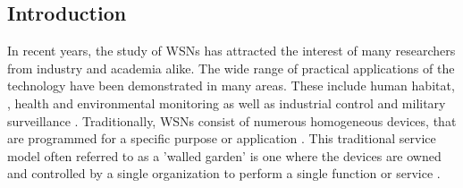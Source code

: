 \subsection{Introduction}

\begin{comment}
The study of Wireless Sensor Networks (WSNs) has increasingly attracted the interest of many researchers in recent years. Their wide range of possible applications have been demonstrated in many areas. These include human habitat, \cite{mainwaring2002wireless}, health \cite{virone2006advanced} and environmental monitoring \cite{4379685,cardell2004field} as well as industry control \cite{1631480} and military surveillance \cite{6268958}.  Advances in the ever-developing field of Micro-Electro-Mechanical Systems (MEMS) in parallel with the latest developments in software technologies have created additional
opportunities to integrate WSNs into our everyday life.  As the field of WSNs matures, ,draws growing attention from industry and academy alike.
%
The explosion of technological innovations in the past decades has irreversibly changed our way of life. Advances in the ever-developing field of Micro-Electro-Mechanical Systems (MEMS), in parallel with the latest developments in software technologies, have created new opportunities to assist our life. By adding computational intelligence to everyday objects they become smarter and more interactive. Together with other embedded devices, such as mobile phones and security cameras, Wireless Sensor Networks (WSNs) contributed to the creation of an additional sensing / actuating layer to our surroundings. This fusion of the various embedded devices into people's living environments is motivated by potential benefits such as simplified management and improved utilization of scarce resources.  

\end{comment}

In recent years, the study of WSNs has attracted the interest of many researchers from industry and academia alike.  The wide range of practical applications of the technology have been demonstrated in many areas. These include human habitat, \cite{mainwaring2002wireless}, health \cite{virone2006advanced} and environmental monitoring \cite{4379685,cardell2004field} as well as industrial control \cite{1631480} and military surveillance \cite{6268958}. Traditionally, WSNs consist of numerous homogeneous devices, that are programmed for a specific purpose or application \cite{ammari2013art,mittal2012contemporary}. This traditional service model often referred to as a 'walled garden' is one where the devices are owned and controlled by a single organization to perform a single function or service \cite{Yick:2008:WSN:1389582.1389832,obaidat2014principles}.

